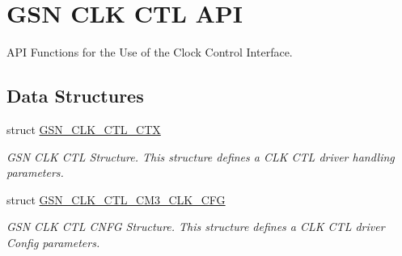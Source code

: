 \hypertarget{a00644}{
\section{GSN CLK CTL API}
\label{a00644}
}


API Functions for the Use of the Clock Control Interface.  


\subsection*{Data Structures}
\begin{DoxyCompactItemize}
\item 
struct \hyperlink{a00039}{GSN\_\-CLK\_\-CTL\_\-CTX}
\begin{DoxyCompactList}\small\item\em GSN CLK CTL Structure. This structure defines a CLK CTL driver handling parameters. \end{DoxyCompactList}\item 
struct \hyperlink{a00038}{GSN\_\-CLK\_\-CTL\_\-CM3\_\-CLK\_\-CFG}
\begin{DoxyCompactList}\small\item\em GSN CLK CTL CNFG Structure. This structure defines a CLK CTL driver Config parameters. \end{DoxyCompactList}\end{DoxyCompactItemize}
